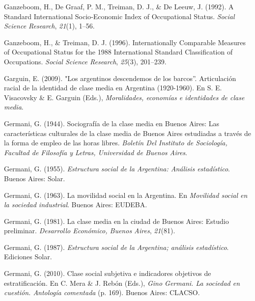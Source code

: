 \documentclass[
]{article}
\newlength{\cslhangindent}
\newlength{\cslentryspacingunit} %
\newenvironment{CSLReferences}[2] %
 {%
  \setlength{\parindent}{0pt}
  \ifodd #1
  \let\oldpar\par
  \def\par{\hangindent=\cslhangindent\oldpar}
  \fi
  \setlength{\parskip}{#2\cslentryspacingunit}
 }%
 {}
\begin{document}
\begin{CSLReferences}{1}{0}
\leavevmode{}%
Ganzeboom, H., De Graaf, P. M., Treiman, D. J., \& De Leeuw, J. (1992). A {Standard} {International} {Socio}-{Economic} {Index} of {Occupational} {Status}. \emph{Social Science Research}, \emph{21}(1), 1--56.

\leavevmode{}%
Ganzeboom, H., \& Treiman, D. J. (1996). Internationally {Comparable} {Measures} of {Occupational} {Status} for the 1988 {International} {Standard} {Classification} of {Occupations}. \emph{Social Science Research}, \emph{25}(3), 201--239.

\leavevmode{}%
Garguin, E. (2009). "{Los} argentinos descendemos de los barcos''. {Articulación} racial de la identidad de clase media en {Argentina} (1920-1960). En S. E. Visacovsky \& E. Garguin (Eds.), \emph{Moralidades, economías e identidades de clase media}.

\leavevmode{}%
Germani, G. (1944). Sociografía de la clase media en {Buenos} {Aires}: {Las} características culturales de la clase media de {Buenos} {Aires} estudiadas a través de la forma de empleo de las horas libres. \emph{Boletín Del Instituto de Sociología, Facultad de Filosofía y Letras, Universidad de Buenos Aires}.

\leavevmode{}%
Germani, G. (1955). \emph{Estructura social de la {Argentina}: {Análisis} estadístico}. Buenos Aires: Solar.

\leavevmode{}%
Germani, G. (1963). La movilidad social en la {Argentina}. En \emph{Movilidad social en la sociedad industrial}. Buenos Aires: EUDEBA.

\leavevmode{}%
Germani, G. (1981). La clase media en la ciudad de {Buenos} {Aires}: {Estudio} preliminar. \emph{Desarrollo Económico, Buenos Aires}, \emph{21}(81).

\leavevmode{}%
Germani, G. (1987). \emph{Estructura social de la {Argentina}; análisis estadístico}. Ediciones Solar.

\leavevmode{}%
Germani, G. (2010). Clase social subjetiva e indicadores objetivos de estratificación. En C. Mera \& J. Rebón (Eds.), \emph{Gino {Germani}. {La} sociedad en cuestión. {Antología} comentada} (p. 169). Buenos Aires: CLACSO.


\end{CSLReferences}
\end{document}
